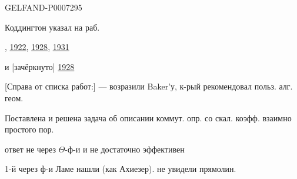\begin{GelfandAdjacentEvidence}{GELFAND-P000729}{5}


Коддингтон указал на раб.

, \quad
\href{https://doi.org/10.1112/plms/s2-21.1.420}{1922},
\href{https://doi.org/10.1098/rspa.1928.0069}{1928},
\href{https://doi.org/10.1098/rspa.1931.0208}{1931}

и  [зачёркнуто] \href{https://doi.org/10.1098/rspa.1928.0070}{1928}
\end{GelfandAdjacentEvidence}


[Справа от списка работ:] --- возразили Baker'у, к-рый рекомендовал польз. алг. геом.

Поставлена и решена задача об описании коммут. опр. со скал. коэфф. взаимно простого пор.

ответ не через \(\Theta\)-ф-и и не достаточно эффективен

1-й через ф-и Ламе нашли (как Ахиезер). не увидели прямолин.


